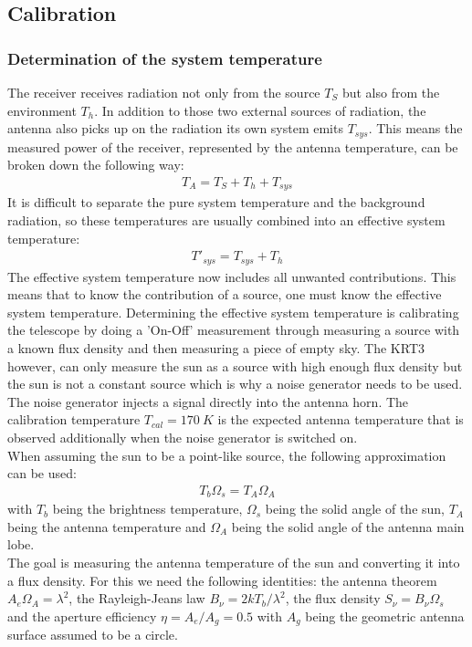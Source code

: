 \documentclass[10pt,a4paper, bibliography=totoc]{scrartcl}
\begin{document}
\subsection{Calibration}
\subsubsection{Determination of the system temperature}
The receiver receives radiation not only from the source $T_S$ but also from the environment $T_h$. In addition to those two external sources of radiation, the antenna also picks up on the radiation its own system emits $T_{sys}$. This means the measured power of the receiver, represented by the antenna temperature, can be broken down the following way:
\begin{align}
	T_A=T_S+T_h+T_{sys}
\end{align}
It is difficult to separate the pure system temperature and the background radiation, so these temperatures are usually combined into an effective system temperature:
\begin{align}
	T'_{sys}=T_{sys}+T_h
\end{align}
The effective system temperature now includes all unwanted contributions. This means that to know the contribution of a source, one must know the effective system temperature. Determining the effective system temperature is calibrating the telescope by doing a 'On-Off' measurement through measuring a source with a known flux density and then measuring a piece of empty sky. The KRT3 however, can only measure the sun as a source with high enough flux density but the sun is not a constant source which is why a noise generator needs to be used.\\
The noise generator injects a signal directly into the antenna horn. The calibration temperature $T_{cal}=\qty{170}{K}$ is the expected antenna temperature that is observed additionally when the noise generator is switched on.\\
When assuming the sun to be a point-like source, the following approximation can be used:
\begin{align}
	T_b\Omega_s=T_A\Omega_A
\end{align}
with $T_b$ being the brightness temperature, $\Omega_s$ being the solid angle of the sun, $T_A$ being the antenna temperature and $\Omega_A$ being the solid angle of the antenna main lobe.\\
The goal is measuring the antenna temperature of the sun and converting it into a flux density. For this we need the following identities: the antenna theorem $A_e\Omega_A=\lambda^2$, the Rayleigh-Jeans law $B_\nu=2kT_b/\lambda^2$, the flux density $S_\nu=B_\nu\Omega_s$ and the aperture efficiency $\eta=A_e/A_g=0.5$ with $A_g$ being the geometric antenna surface assumed to be a circle.
\end{document}
